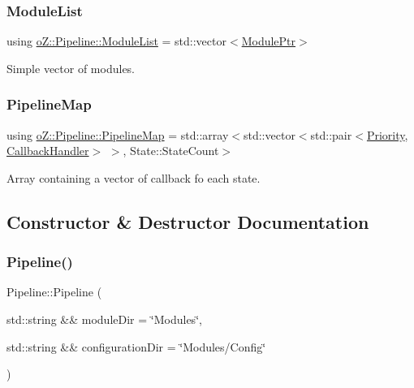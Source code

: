 \mbox{\label{classo_z_1_1_pipeline_a3bb478d291a83763b269d8d27e186a47}} 
\subsubsection{\texorpdfstring{ModuleList}{ModuleList}}
{\footnotesize\ttfamily using \mbox{\hyperlink{classo_z_1_1_pipeline_a3bb478d291a83763b269d8d27e186a47}{o\+Z\+::\+Pipeline\+::\+Module\+List}} =  std\+::vector$<$\mbox{\hyperlink{namespaceo_z_af5a56aaaee027504979038f38991adcf}{Module\+Ptr}}$>$}



Simple vector of modules. 

\mbox{\label{classo_z_1_1_pipeline_ae4082276a9a2bafefab47a1298feec67}} 
\subsubsection{\texorpdfstring{PipelineMap}{PipelineMap}}
{\footnotesize\ttfamily using \mbox{\hyperlink{classo_z_1_1_pipeline_ae4082276a9a2bafefab47a1298feec67}{o\+Z\+::\+Pipeline\+::\+Pipeline\+Map}} =  std\+::array$<$std\+::vector$<$std\+::pair$<$\mbox{\hyperlink{namespaceo_z_af05a92eb185d18369e9b4acdcd9dcd12}{Priority}}, \mbox{\hyperlink{classo_z_1_1_pipeline_a5a71ea2f2d4be5b82589c1b8175722f4}{Callback\+Handler}}$>$ $>$, State\+::\+State\+Count$>$}



Array containing a vector of callback fo each state. 



\subsection{Constructor \& Destructor Documentation}
\mbox{\label{classo_z_1_1_pipeline_a5fc2efefb6e953ce5a4f8d7d3437619a}} 
\subsubsection{\texorpdfstring{Pipeline()}{Pipeline()}\hspace{0.1cm}{\footnotesize\ttfamily [1/3]}}
{\footnotesize\ttfamily Pipeline\+::\+Pipeline (\begin{DoxyParamCaption}\item[{std\+::string \&\&}]{module\+Dir = {\ttfamily \char`\"{}Modules\char`\"{}},  }\item[{std\+::string \&\&}]{configuration\+Dir = {\ttfamily \char`\"{}Modules/Config\char`\"{}} }\end{DoxyParamCaption})}



